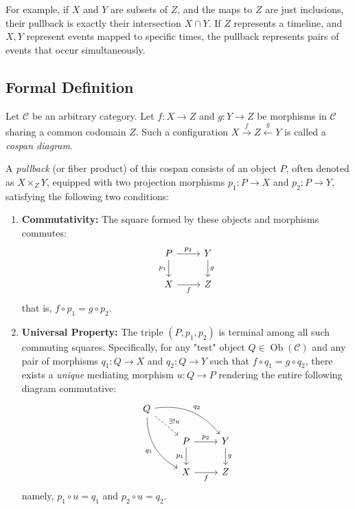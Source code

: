 For example, if $X$ and $Y$ are subsets of $Z$, and the maps to $Z$ are just inclusions, their pullback is exactly their intersection $X \cap Y$. If $Z$ represents a timeline, and $X, Y$ represent events mapped to specific times, the pullback represents pairs of events that occur simultaneously.

\subsection{Formal Definition}

\begin{definition}
Let $\mathcal{C}$ be an arbitrary category. Let $f: X \to Z$ and $g: Y \to Z$ be morphisms in $\mathcal{C}$ sharing a common codomain $Z$. Such a configuration $X \xrightarrow{f} Z \xleftarrow{g} Y$ is called a \emph{cospan diagram}. 

A \emph{pullback} (or fiber product) of this cospan consists of an object $P$, often denoted as $X \times_Z Y$, equipped with two projection morphisms $p_1: P \to X$ and $p_2: P \to Y$, satisfying the following two conditions:
\begin{enumerate}
    \item \textbf{Commutativity:} The square formed by these objects and morphisms commutes:
    \begin{equation}
    \label{eq:pullback_square}
    \begin{tikzcd}
    P \arrow[r, "p_2"] \arrow[d, "p_1"'] & Y \arrow[d, "g"] \\
    X \arrow[r, "f"'] & Z
    \end{tikzcd}
    \end{equation}
    that is, $f \circ p_1 = g \circ p_2$. 
    \item \textbf{Universal Property:} The triple $(P, p_1, p_2)$ is terminal among all such commuting squares. Specifically, for any "test" object $Q \in \operatorname{Ob}(\mathcal{C})$ and any pair of morphisms $q_1: Q \to X$ and $q_2: Q \to Y$ such that $f \circ q_1 = g \circ q_2$, there exists a \emph{unique} mediating morphism $u: Q \to P$ rendering the entire following diagram commutative:
    \begin{equation}
    \label{eq:pullback_universal}
    \begin{tikzcd}
    Q \arrow[drr, "q_2", bend left] \arrow[ddr, "q_1"', bend right] \arrow[dr, dashed, "\exists ! u"] & & \\
    & P \arrow[r, "p_2"] \arrow[d, "p_1"'] & Y \arrow[d, "g"] \\
    & X \arrow[r, "f"'] & Z
    \end{tikzcd}
    \end{equation}
    namely, $p_1 \circ u = q_1$ and $p_2 \circ u = q_2$.
\end{enumerate}
\end{definition}

